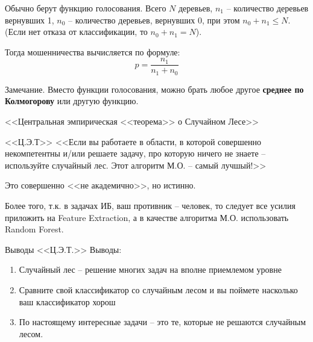 \begin{frame}
	Обычно берут функцию голосования. 
	Всего $N$ деревьев, 
	$n_1$ -- количество деревьев вернувших 1,
	$n_0$ -- количество деревьев, вернувших 0,
	при этом $n_0 + n_1 \leqslant N$. 
	(Если нет отказа от классификации, то $n_0 + n_1 = N$).
	
	Тогда  мошенничества
	вычисляется по формуле:
	\begin{equation}
	p = \frac{n_1}{n_1+n_0}
	\end{equation}
	
	\begin{block}{Замечание.}
	Вместо функции голосования, можно брать любое другое 
	\textbf{среднее по Колмогорову} или другую функцию.
	\end{block}
\end{frame}

\begin{frame}{<<Центральная эмпирическая <<теорема>> о Случайном Лесе>>}
	\begin{block}{<<Ц.Э.Т>>}
	<<Если вы работаете в области,
	в которой совершенно некомпетентны
	и/или решаете задачу, про которую ничего не знаете --
	используйте случайный лес.
	Этот алгоритм М.О. -- самый лучшый!>>
	\end{block}
	Это совершенно <<не академично>>, но истинно.
	
	Более того, т.к. в задачах ИБ, ваш противник --
	человек, то следует все усилия приложить на 
	Feature Extraction, а в качестве алгоритма М.О.
	использовать Random Forest. 
\end{frame}

\begin{frame}{Выводы <<Ц.Э.Т.>>}
	Выводы: 
	\begin{enumerate}
	\item Случайный лес -- решение многих 
	задач на вполне приемлемом уровне
	\item Сравните свой классификатор со случайным лесом 
	и вы поймете насколько ваш классификатор хорош
	\item По настоящему интересные задачи -- это те,
	которые не решаются случайным лесом.
	\end{enumerate}
\end{frame}

